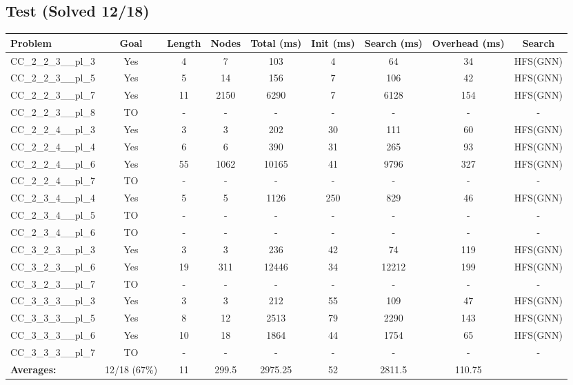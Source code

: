 \documentclass{article}
\begin{document}
\subsection*{Test (Solved 12/18)}
\begin{tabular}{lcccccccc}
\toprule
Problem & Goal & Length & Nodes & Total (ms) & Init (ms) & Search (ms) & Overhead (ms) & Search \\
\midrule
CC\_2\_2\_3\_\_pl\_3 & Yes & 4 & 7 & 103 & 4 & 64 & 34 & HFS(GNN) \\
CC\_2\_2\_3\_\_pl\_5 & Yes & 5 & 14 & 156 & 7 & 106 & 42 & HFS(GNN) \\
CC\_2\_2\_3\_\_pl\_7 & Yes & 11 & 2150 & 6290 & 7 & 6128 & 154 & HFS(GNN) \\
CC\_2\_2\_3\_\_pl\_8 & TO & - & - & - & - & - & - & - \\
CC\_2\_2\_4\_\_pl\_3 & Yes & 3 & 3 & 202 & 30 & 111 & 60 & HFS(GNN) \\
CC\_2\_2\_4\_\_pl\_4 & Yes & 6 & 6 & 390 & 31 & 265 & 93 & HFS(GNN) \\
CC\_2\_2\_4\_\_pl\_6 & Yes & 55 & 1062 & 10165 & 41 & 9796 & 327 & HFS(GNN) \\
CC\_2\_2\_4\_\_pl\_7 & TO & - & - & - & - & - & - & - \\
CC\_2\_3\_4\_\_pl\_4 & Yes & 5 & 5 & 1126 & 250 & 829 & 46 & HFS(GNN) \\
CC\_2\_3\_4\_\_pl\_5 & TO & - & - & - & - & - & - & - \\
CC\_2\_3\_4\_\_pl\_6 & TO & - & - & - & - & - & - & - \\
CC\_3\_2\_3\_\_pl\_3 & Yes & 3 & 3 & 236 & 42 & 74 & 119 & HFS(GNN) \\
CC\_3\_2\_3\_\_pl\_6 & Yes & 19 & 311 & 12446 & 34 & 12212 & 199 & HFS(GNN) \\
CC\_3\_2\_3\_\_pl\_7 & TO & - & - & - & - & - & - & - \\
CC\_3\_3\_3\_\_pl\_3 & Yes & 3 & 3 & 212 & 55 & 109 & 47 & HFS(GNN) \\
CC\_3\_3\_3\_\_pl\_5 & Yes & 8 & 12 & 2513 & 79 & 2290 & 143 & HFS(GNN) \\
CC\_3\_3\_3\_\_pl\_6 & Yes & 10 & 18 & 1864 & 44 & 1754 & 65 & HFS(GNN) \\
CC\_3\_3\_3\_\_pl\_7 & TO & - & - & - & - & - & - & - \\
\textbf{Averages:} & 12/18 (67\%) & 11 & 299.5 & 2975.25 & 52 & 2811.5 & 110.75 & \\
\bottomrule
\end{tabular}
\\[0.7cm]
\end{document}
